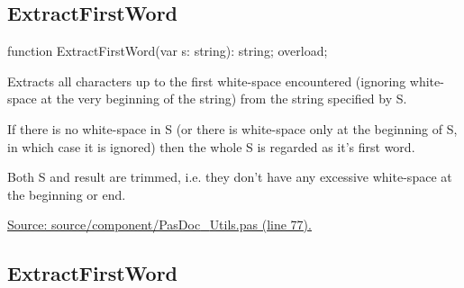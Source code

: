 \documentclass{report}
\newif\ifpdf
\begin{document}
\subsection*{ExtractFirstWord}
\fi
\label{PasDoc_Utils-ExtractFirstWord}
\begin{list}{}{
\setlength{\itemindent}{0cm}
\setlength{\listparindent}{0cm}
\setlength{\leftmargin}{\evensidemargin}
\addtolength{\leftmargin}{\tmplength}
\settowidth{\labelsep}{X}
\addtolength{\leftmargin}{\labelsep}
\setlength{\labelwidth}{\tmplength}
}
\item[\textbf{Declaration}\hfill]
\ifpdf
\begin{flushleft}
\fi
\begin{ttfamily}
function ExtractFirstWord(var s: string): string; overload;\end{ttfamily}

\ifpdf
\end{flushleft}
\fi

\par
\item[\textbf{Description}]
Extracts all characters up to the first white{-}space encountered (ignoring white{-}space at the very beginning of the string) from the string specified by S.

If there is no white{-}space in S (or there is white{-}space only at the beginning of S, in which case it is ignored) then the whole S is regarded as it's first word.

Both S and result are trimmed, i.e. they don't have any excessive white{-}space at the beginning or end.\par
\href{https://github.com/pasdoc/pasdoc/blob/master/source/component/PasDoc_Utils.pas#L77}{Source: source/component/PasDoc{\_}Utils.pas (line 77).}

\end{list}
\ifpdf
\subsection*{\large{\textbf{ExtractFirstWord}}\normalsize\hspace{1ex}\hrulefill}
\else
\end{document}
